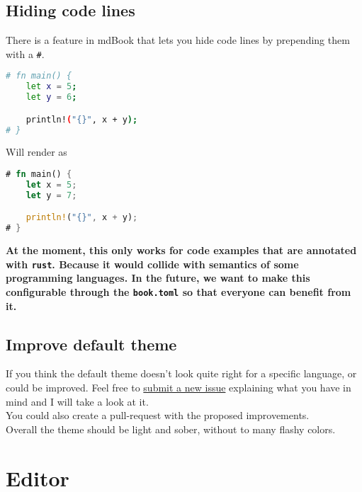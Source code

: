 \documentclass{article}
\begin{document}
\subsection{Hiding code lines}
\label{Hiding code lines}
\label{hiding-code-lines}

There is a feature in mdBook that lets you hide code lines by prepending them
with a \lstinline|#|.\\
\begin{lstlisting}[language=bash]
# fn main() {
    let x = 5;
    let y = 6;

    println!("{}", x + y);
# }

\end{lstlisting}

Will render as\\
\begin{lstlisting}[language=rust]
# fn main() {
    let x = 5;
    let y = 7;

    println!("{}", x + y);
# }

\end{lstlisting}

\textbf{At the moment, this only works for code examples that are annotated with
\lstinline|rust|. Because it would collide with semantics of some programming languages.
In the future, we want to make this configurable through the \lstinline|book.toml| so that
everyone can benefit from it.}\\

\subsection{Improve default theme}
\label{Improve default theme}
\label{improve-default-theme}

If you think the default theme doesn't look quite right for a specific language,
or could be improved. Feel free to \href{https://github.com/rust-lang-nursery/mdBook/issues}{submit a new
issue} explaining what you
have in mind and I will take a look at it.\\

You could also create a pull-request with the proposed improvements.\\

Overall the theme should be light and sober, without to many flashy colors.\\

\section{Editor}
\label{Editor}
\label{editor}
\end{document}
